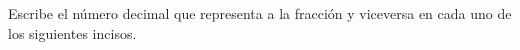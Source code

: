 \documentclass[12pt,addpoints]{evalua}
\begin{document}
\begin{questions}
\begin{multicols}{2}
\begin{parts}
            \end{parts}
      \end{multicols}

      \question[15] Escribe el número decimal que representa a la fracción y viceversa en cada uno de los siguientes incisos.
      \begin{multicols}{2}
            \begin{parts}

\end{parts}
\end{multicols}
\end{questions}
\end{document}
